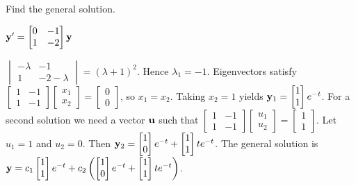 \documentclass{ximera}
\begin{document}
 \begin{problem}\label{exer:10.5.2}
 Find the general solution.
 
 $ {\bf y}'= \begin{bmatrix}0&-1\\1&-2\end{bmatrix}{\bf y}$

 \begin{solution}
     $ \begin{vmatrix}-\lambda&-1\\1&-2-\lambda\end{vmatrix}=(\lambda+1)^2$.
Hence $\lambda_1=-1$.
Eigenvectors   satisfy
$  \begin{bmatrix}1&-1\\1&-1\end{bmatrix} \begin{bmatrix}x_1\\x_2\end{bmatrix}= \begin{bmatrix}0\\0\end{bmatrix}$,
so $x_1=x_2$.  Taking $x_2=1$ yields
${\bf y}_1=  \begin{bmatrix}1\\1\end{bmatrix}e^{-t}$.
For a second solution we need a vector ${\bf u}$
such that $  \begin{bmatrix}1&-1\\1&-1\end{bmatrix} \begin{bmatrix}u_1\\u_2\end{bmatrix}
= \begin{bmatrix}1\\1\end{bmatrix}$. Let $u_1=1$ and $u_2=0$. Then
${\bf y}_2=  \begin{bmatrix}1\\0\end{bmatrix}e^{-t}+  \begin{bmatrix}1\\1\end{bmatrix}te^{-t}$.
The general solution is
${\bf y}= 
c_1 \begin{bmatrix}1\\1\end{bmatrix}e^{-t}+c_2\left( \begin{bmatrix}1\\0\end{bmatrix}e^{-t}+ \begin{bmatrix}1\\1\end{bmatrix}te^{-t}\right)$.
 \end{solution}
 \end{problem}
\end{document}
